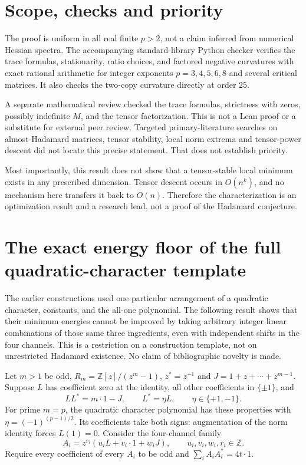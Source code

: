 \documentclass[11pt]{article}
\newcommand{\Z}{\mathbb Z}
\begin{document}
\section{Scope, checks and priority}
The proof is uniform in all real finite $p>2$, not a claim inferred
from numerical Hessian spectra. The accompanying standard-library
Python checker verifies the trace formulas, stationarity, ratio choices,
and factored negative curvatures with exact rational arithmetic for
integer exponents $p=3,4,5,6,8$ and several critical matrices. It also
checks the two-copy curvature directly at order $25$.

A separate mathematical review checked the trace formulas, strictness
with zeros, possibly indefinite $M$, and the tensor factorization.
This is not a Lean proof or a substitute for external peer review.
Targeted primary-literature searches on almost-Hadamard matrices,
tensor stability, local norm extrema and tensor-power descent did not
locate this precise statement. That does not establish priority.

Most importantly, this result does not show that a tensor-stable local
minimum exists in any prescribed dimension. Tensor descent occurs in
$O(n^k)$, and no mechanism here transfers it back to $O(n)$. Therefore
the characterization is an optimization result and a research lead,
not a proof of the Hadamard conjecture.


\section{The exact energy floor of the full quadratic-character template}
The earlier constructions used one particular arrangement of a quadratic
character, constants, and the all-one polynomial. The following result
shows that their minimum energies cannot be improved by taking arbitrary
integer linear combinations of those same three ingredients, even with
independent shifts in the four channels. This is a restriction on a
construction template, not on unrestricted Hadamard existence. No claim
of bibliographic novelty is made.

Let $m>1$ be odd, $R_m=\Z[z]/(z^m-1)$, $z^*=z^{-1}$ and
$J=1+z+\cdots+z^{m-1}$. Suppose $L$ has coefficient zero at the
identity, all other coefficients in $\{\pm1\}$, and
\[
 LL^*=m\cdot1-J,\qquad L^*=\eta L,\qquad \eta\in\{+1,-1\}.
\]
For prime $m=p$, the quadratic character polynomial has these
properties with $\eta=(-1)^{(p-1)/2}$. Its coefficients take both signs:
augmentation of the norm identity forces $L(1)=0$.
Consider the four-channel family
\begin{equation}\label{eq:fullspan}
 A_i=z^{r_i}(u_iL+v_i\cdot1+w_iJ),\qquad
 u_i,v_i,w_i,r_i\in\Z.
\end{equation}
Require every coefficient of every $A_i$ to be odd and
$\sum_iA_iA_i^*=4t\cdot1$.
\end{document}
